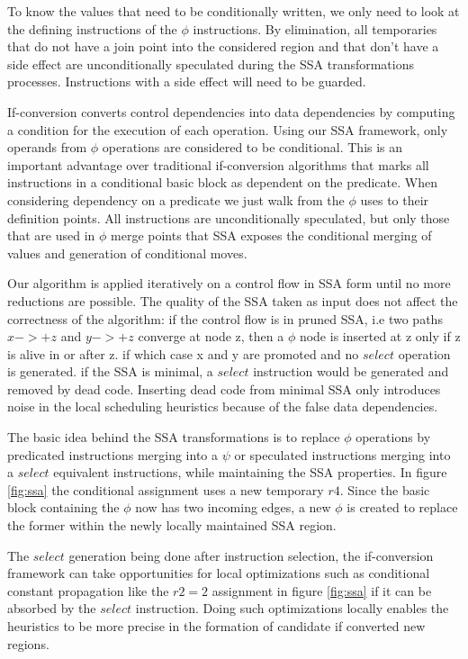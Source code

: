 To know the values that need to be conditionally written, we only need to look at the defining instructions of the $\phi$ instructions. By elimination, all temporaries that do not have a join point into the considered region and that don't have a side effect are unconditionally speculated during the SSA transformations processes. Instructions with a side effect will need to be guarded.

If-conversion converts control dependencies into data dependencies by computing a condition for the execution of each operation. Using our SSA framework, only operands from $\phi$ operations are considered to be conditional. This is an important advantage over traditional if-conversion algorithms that marks all instructions in a conditional basic block as dependent on the predicate. When considering dependency on a predicate we just walk from the $\phi$ uses to their definition points. All instructions are unconditionally speculated, but only those that are used in $\phi$ merge points that SSA exposes the conditional merging of values and generation of conditional moves.

Our algorithm is applied iteratively on a control flow in SSA form until no more reductions are possible. The quality of the SSA taken as input does not affect the correctness of the algorithm: if the control flow is in pruned SSA, i.e two paths $x->+z$ and $y->+z$ converge at node z, then a $\phi$ node is inserted at z only if z is alive in or after z. if which case x and y are promoted and no $select$ operation is generated. if the SSA is minimal, a $select$ instruction would be generated and removed by dead code. Inserting dead code from minimal SSA only introduces noise in the local scheduling heuristics because of the false data dependencies.

The basic idea behind the SSA transformations is to replace $\phi$ operations by predicated instructions merging into a $\psi$ or speculated instructions merging into a $select$ equivalent instructions, while maintaining the SSA properties. In figure \ref{fig:ssa} the conditional assignment uses a new temporary $r4$. Since the basic block containing the $\phi$ now has two incoming edges, a new $\phi$ is created to replace the former within the newly locally maintained SSA region.

The $select$ generation being done after instruction selection, the if-conversion framework can take opportunities for local optimizations such as conditional constant propagation like the $r2=2$ assignment in figure \ref{fig:ssa} if it can be absorbed by the $select$ instruction. Doing such optimizations locally enables the heuristics to be more precise in the formation of candidate if converted new regions.

